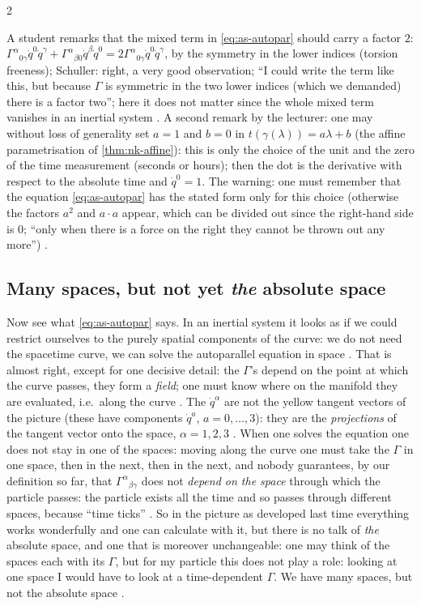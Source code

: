\begin{paracol}{2}
\begin{coursenote}[The factor 2 and the choice $a=1$, $b=0$ (student remark)]
A student remarks that the mixed term in \eqref{eq:as-autopar} should carry a factor $2$: $\Gamma^\alpha{}_{0\gamma}\dot q^0\dot q^\gamma+\Gamma^\alpha{}_{\beta0}\dot q^\beta\dot q^0=2\Gamma^\alpha{}_{0\gamma}\dot q^0\dot q^\gamma$,
by the symmetry in the lower indices (torsion freeness); Schuller: right, a very good observation; ``I could write the term like this, but because $\Gamma$ is symmetric in the two lower indices (which we demanded) there
is a factor two''; here it does not matter since the whole mixed term vanishes in an inertial system . A second remark by the lecturer: one may without loss of generality set $a=1$ and $b=0$
in $t(\gamma(\lambda))=a\lambda+b$ (the affine parametrisation of \cref{thm:nk-affine}): this is only the choice of the unit and the zero of the time measurement (seconds or hours); then the dot is the derivative with respect to the absolute time and $\dot q^0=1$.
The warning: one must remember that the equation \eqref{eq:as-autopar} has the stated form only for this choice (otherwise the factors $a^2$ and $a\cdot a$ appear, which can be divided out since the right-hand side is $0$; ``only when there is a force on the right they cannot be thrown out any more'') .
\end{coursenote}

\subsection{Many spaces, but not yet \emph{the} absolute space}

Now see what \eqref{eq:as-autopar} says. In an inertial system it looks as if we could restrict ourselves to the purely spatial components of the curve: we do not need the spacetime curve, we can solve the autoparallel equation in space
. That is almost right, except for one decisive detail: the $\Gamma$'s depend on the point at which the curve passes, they form a \emph{field}; one must know where on the manifold they are evaluated, i.e.\ along the curve
. The $\dot q^\alpha$ are not the yellow tangent vectors of the picture (these have components $\dot q^a$, $a=0,\dots,3$): they are the \emph{projections} of the tangent vector onto the space, $\alpha=1,2,3$ .
When one solves the equation one does not stay in one of the spaces: moving along the curve one must take the $\Gamma$ in one space, then in the next, then in the next, and nobody guarantees, by our
definition so far, that $\Gamma^\alpha{}_{\beta\gamma}$ does not \emph{depend on the space} through which the particle passes: the particle exists all the time and so passes through different spaces, because ``time ticks'' .
So in the picture as developed last time everything works wonderfully and one can calculate with it, but there is no talk of \emph{the} absolute space, and one that is moreover unchangeable: one may think of the spaces each with its
$\Gamma$, but for my particle this does not play a role: looking at one space I would have to look at a time-dependent $\Gamma$. We have many spaces, but not the absolute space .


\end{paracol}
